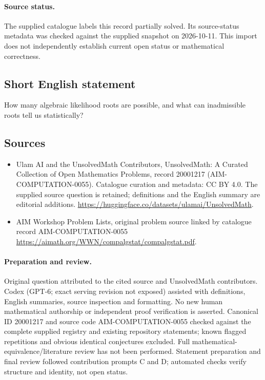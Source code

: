 \documentclass[11pt]{article}
\begin{document}
\paragraph{Source status.}
The supplied catalogue labels this record partially solved. Its source-status metadata was checked against the supplied snapshot on 2026-10-11. This import does not independently establish current open status or mathematical correctness.
\subsection{Short English statement}
How many algebraic likelihood roots are possible, and what can inadmissible roots tell us statistically?
\subsection{Sources}
\begin{itemize}
\item[S1] Ulam AI and the UnsolvedMath Contributors, UnsolvedMath: A Curated Collection of Open Mathematics Problems, record 20001217 (AIM-COMPUTATION-0055). Catalogue curation and metadata: CC BY 4.0. The supplied source question is retained; definitions and the English summary are editorial additions.
\url{https://huggingface.co/datasets/ulamai/UnsolvedMath}.
\item[S2] AIM Workshop Problem Lists, original problem source linked by catalogue record AIM-COMPUTATION-0055
\url{https://aimath.org/WWN/compalgstat/compalgstat.pdf}.
\end{itemize}
\paragraph{Preparation and review.}
Original question attributed to the cited source and UnsolvedMath contributors. Codex (GPT-6; exact serving revision not exposed) assisted with definitions, English summaries, source inspection and formatting. No new human mathematical authorship or independent proof verification is asserted. Canonical ID 20001217 and source code AIM-COMPUTATION-0055 checked against the complete supplied registry and existing repository statements; known flagged repetitions and obvious identical conjectures excluded. Full mathematical-equivalence/literature review has not been performed. Statement preparation and final review followed contribution prompts C and D; automated checks verify structure and identity, not open status.
\label{end:20001217}
\end{document}
